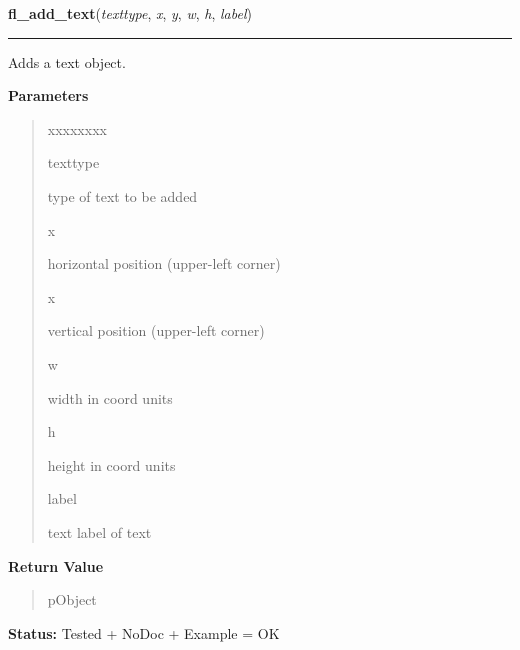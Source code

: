     \label{xformslib:library:fl_add_text}

    \vspace{0.5ex}

\hspace{.8\funcindent}\begin{boxedminipage}{\funcwidth}

    \raggedright \textbf{fl\_add\_text}(\textit{texttype}, \textit{x}, \textit{y}, \textit{w}, \textit{h}, \textit{label})

    \vspace{-1.5ex}

    \rule{\textwidth}{0.5\fboxrule}
\setlength{\parskip}{2ex}
    Adds a text object.

\setlength{\parskip}{1ex}
      \textbf{Parameters}
      \vspace{-1ex}

      \begin{quote}
        \begin{Ventry}{xxxxxxxx}

          \item[texttype]

          type of text to be added

          \item[x]

          horizontal position (upper-left corner)

          \item[x]

          vertical position (upper-left corner)

          \item[w]

          width in coord units

          \item[h]

          height in coord units

          \item[label]

          text label of text

        \end{Ventry}

      \end{quote}

      \textbf{Return Value}
    \vspace{-1ex}

      \begin{quote}
      pObject

      \end{quote}

\textbf{Status:} Tested + NoDoc + Example = OK



    \end{boxedminipage}

